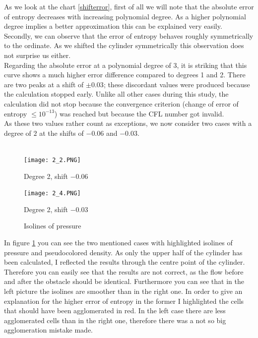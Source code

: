 	As we look at the chart \ref{shifterror}, first of all we will note that the absolute error of entropy decreases with increasing polynomial degree. As a higher polynomial degree implies a better approximation this can be explained very easily. \\ \indent
	Secondly, we can observe that the error of entropy behaves roughly symmetrically to the ordinate. As we shifted the cylinder symmetrically this observation does not surprise us either. \\ \indent
	Regarding the absolute error at a polynomial degree of 3, it is striking that this curve shows a much higher error difference compared to degrees 1 and 2. There are two peaks at a shift of $\pm 0.03$; these discordant values were produced because the calculation stopped early. Unlike all other cases during this study, the calculation did not stop because the convergence criterion (change of error of entropy $\leq 10^{-13}$) was reached but because the CFL number got invalid.\\ \indent
	As these two values rather count as exceptions, we now consider two cases with a degree of $2$ at the shifts of $-0.06$ and $-0.03$. \\\\
	
	\begin{figure}[htp]
		\centering
		\begin{minipage}[b]{0.5\textwidth}
			\centering
			\texttt{[image: 2\_2.PNG]}
			\caption*{Degree 2, shift $-0.06$}
			\label{fig:2_2}
		\end{minipage}%
		\begin{minipage}[b]{0.5\textwidth}
			\centering
			\texttt{[image: 2\_4.PNG]}
			\caption*{Degree 2, shift $-0.03$}
			\label{fig:2_4}
		\end{minipage}
		\caption{Isolines of pressure}\label{fig:isoshift}
	\end{figure}
	
	In figure \ref{fig:isoshift} you can see the two mentioned cases with highlighted isolines of pressure and pseudocolored density. As only the upper half of the cylinder has been calculated, I reflected the results through the centre point of the cylinder. Therefore you can easily see that the results are not correct, as the flow before and after the obstacle should be identical. Furthermore you can see that in the left picture the isolines are smoother than in the right one. In order to give an explanation for the higher error of entropy in the former I highlighted the cells that should have been agglomerated in red. In the left case there are less agglomerated cells than in the right one, therefore there was a not so big agglomeration mistake made.\\\\
	

